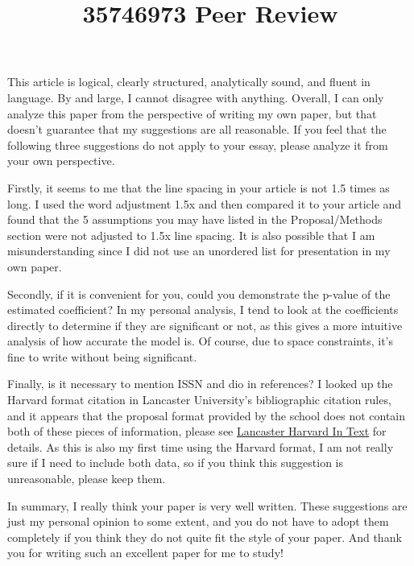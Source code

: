 \documentclass[a4paper,11pt]{article}
\title{35746973 Peer Review}
\begin{document}
\maketitle

This article is logical, clearly structured, analytically sound, and fluent in language. By and large, I cannot disagree with anything. Overall, I can only analyze this paper from the perspective of writing my own paper, but that doesn't guarantee that my suggestions are all reasonable. If you feel that the following three suggestions do not apply to your essay, please analyze it from your own perspective.

Firstly, it seems to me that the line spacing in your article is not 1.5 times as long. I used the word adjustment 1.5x and then compared it to your article and found that the 5 assumptions you may have listed in the Proposal/Methods section were not adjusted to 1.5x line spacing. It is also possible that I am misunderstanding since I did not use an unordered list for presentation in my own paper.

Secondly, if it is convenient for you, could you demonstrate the p-value of the estimated coefficient? In my personal analysis, I tend to look at the coefficients directly to determine if they are significant or not, as this gives a more intuitive analysis of how accurate the model is. Of course, due to space constraints, it's fine to write without being significant.

Finally, is it necessary to mention ISSN and dio in references? I looked up the Harvard format citation in Lancaster University's bibliographic citation rules, and it appears that the proposal format provided by the school does not contain both of these pieces of information, please see \href{https://lancaster.libguides.com/harvard/in-text}{Lancaster Harvard In Text} for details. As this is also my first time using the Harvard format, I am not really sure if I need to include both data, so if you think this suggestion is unreasonable, please keep them.

In summary, I really think your paper is very well written. These suggestions are just my personal opinion to some extent, and you do not have to adopt them completely if you think they do not quite fit the style of your paper. And thank you for writing such an excellent paper for me to study!
\end{document}
